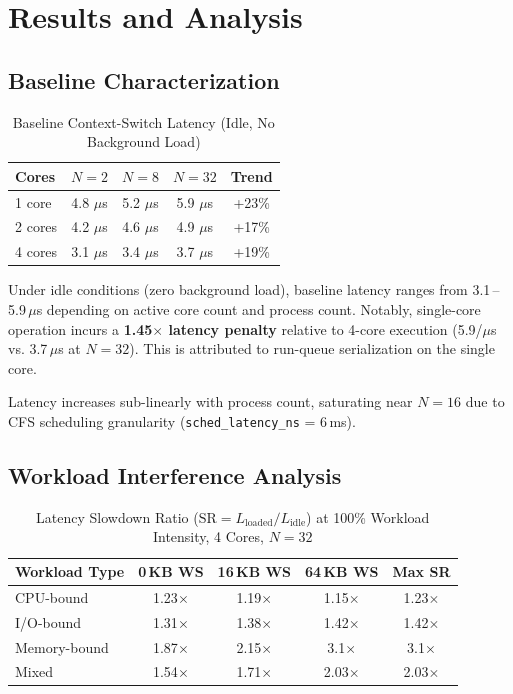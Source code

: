 \documentclass[conference]{IEEEtran}
\begin{document}
\section{Results and Analysis}
\label{sec:results}

\subsection{Baseline Characterization}

\begin{table}[h]
\centering
\caption{Baseline Context-Switch Latency (Idle, No Background Load)}
\label{tab:baseline}
\begin{tabular}{lcccc}
\toprule
\textbf{Cores} & \textbf{$N=2$} & \textbf{$N=8$} & \textbf{$N=32$} & \textbf{Trend} \\
\midrule
1 core   & 4.8 $\mu$s & 5.2 $\mu$s & 5.9 $\mu$s & +23\% \\
2 cores  & 4.2 $\mu$s & 4.6 $\mu$s & 4.9 $\mu$s & +17\% \\
4 cores  & 3.1 $\mu$s & 3.4 $\mu$s & 3.7 $\mu$s & +19\% \\
\bottomrule
\end{tabular}
\end{table}

Under idle conditions (zero background load), baseline latency ranges from
3.1\,--5.9\,$\mu$s depending on active core count and process count.
Notably, single-core operation incurs a \textbf{1.45$\times$ latency penalty}
relative to 4-core execution (5.9/$\mu$s vs. 3.7\,$\mu$s at $N=32$).
This is attributed to run-queue serialization on the single core.

Latency increases sub-linearly with process count, saturating near $N=16$
due to CFS scheduling granularity (\texttt{sched\_latency\_ns} = 6\,ms).

\subsection{Workload Interference Analysis}

\begin{table}[h]
\centering
\caption{Latency Slowdown Ratio ($\text{SR} = L_{\text{loaded}} / L_{\text{idle}}$)
         at 100\% Workload Intensity, 4 Cores, $N=32$}
\label{tab:workload_sr}
\begin{tabular}{lcccc}
\toprule
\textbf{Workload Type} & \textbf{0\,KB WS} & \textbf{16\,KB WS} & 
\textbf{64\,KB WS} & \textbf{Max SR} \\
\midrule
CPU-bound       & 1.23$\times$ & 1.19$\times$ & 1.15$\times$ & 1.23$\times$ \\
I/O-bound       & 1.31$\times$ & 1.38$\times$ & 1.42$\times$ & 1.42$\times$ \\
Memory-bound    & 1.87$\times$ & 2.15$\times$ & 3.1$\times$  & 3.1$\times$ \\
Mixed           & 1.54$\times$ & 1.71$\times$ & 2.03$\times$ & 2.03$\times$ \\
\bottomrule
\end{tabular}
\end{table}
\end{document}
